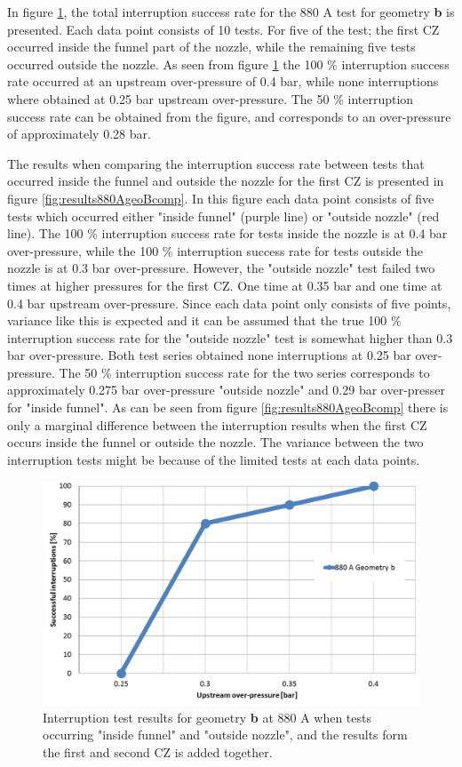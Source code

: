 \documentclass[10pt,b5paper,twoside]{article}
\begin{document}
In figure \ref{fig:results880AgeoB}, the total interruption success rate for the 880 A test for geometry \textbf{b} is presented. Each data point consists of 10 tests. For five of the test; the first CZ occurred inside the funnel part of the nozzle, while the remaining five tests occurred outside the nozzle. As seen from figure \ref{fig:results880AgeoB} the 100 \% interruption success rate occurred at an upstream over-pressure of 0.4 bar, while none interruptions where obtained at 0.25 bar upstream over-pressure. The 50 \% interruption success rate can be obtained from the figure, and corresponds to an over-pressure of approximately 0.28 bar.

The results when comparing the interruption success rate between tests that occurred inside the funnel and outside the nozzle for the first CZ is presented in figure \ref{fig:results880AgeoBcomp}. In this figure each data point consists of five tests which occurred either "inside funnel" (purple line) or "outside nozzle" (red line). The 100 \% interruption success rate for tests inside the nozzle is at 0.4 bar over-pressure, while the 100 \% interruption success rate for tests outside the nozzle is at 0.3 bar over-pressure. However, the "outside nozzle" test failed two times at higher pressures for the first CZ. One time at 0.35 bar and one time at 0.4 bar upstream over-pressure. Since each data point only consists of five points, variance like this is expected and it can be assumed that the true 100 \% interruption success rate for the "outside nozzle" test is somewhat higher than 0.3 bar over-pressure. Both test series obtained none interruptions at 0.25 bar over-pressure. The 50 \% interruption success rate for the two series corresponds to approximately 0.275 bar over-pressure "outside nozzle" and 0.29 bar over-presser for "inside funnel". As can be seen from figure \ref{fig:results880AgeoBcomp} there is only a marginal difference between the interruption results when the first CZ occurs inside the funnel or outside the nozzle. The variance between the two interruption tests might be because of the limited tests at each data points.

\begin{figure}[H]
\centering
\includegraphics[scale=0.45]{Bilder/Results/geoB880amp.PNG}
\caption{Interruption test results for geometry \textbf{b} at 880 A when tests occurring "inside funnel" and "outside nozzle", and the results form the first and second CZ is added together.} \label{fig:results880AgeoB}
\end{figure}
\end{document}
